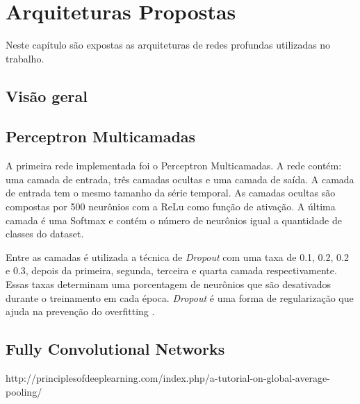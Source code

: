 \chapter{Arquiteturas Propostas} \label{cap3}

Neste capítulo são expostas as arquiteturas de redes profundas utilizadas no trabalho.


\section{Visão geral}


\section{Perceptron Multicamadas}
A primeira rede implementada foi o Perceptron Multicamadas. A rede contém: uma camada de entrada, três camadas ocultas e uma camada de saída. A camada de entrada tem o mesmo tamanho da série temporal. As camadas ocultas são compostas por 500 neurônios com a ReLu como função de ativação. A última camada é uma Softmax e contém o número de neurônios igual a quantidade de classes do dataset.

Entre as camadas é utilizada a técnica de \textit{Dropout} com uma taxa de 0.1, 0.2, 0.2 e 0.3, depois da primeira, segunda, terceira e quarta camada respectivamente. Essas taxas determinam uma porcentagem de neurônios que são desativados durante o treinamento em cada época. \textit{Dropout} é uma forma de regularização que ajuda na prevenção do overfitting \cite{dropout2014}. 


\section{Fully Convolutional Networks}

http://principlesofdeeplearning.com/index.php/a-tutorial-on-global-average-pooling/


